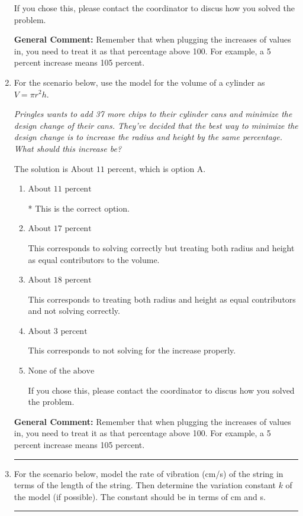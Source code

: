\documentclass{extbook}[14pt]
\newcommand{\litem}[1]{\item #1

\rule{\textwidth}{0.4pt}}
\begin{document}
\begin{enumerate}
{\begin{enumerate}[label=\Alph*.]
If you chose this, please contact the coordinator to discus how you solved the problem.
\end{enumerate}

\textbf{General Comment:} Remember that when plugging the increases of values in, you need to treat it as that percentage above 100. For example, a 5 percent increase means 105 percent.
}
\litem{
For the scenario below, use the model for the volume of a cylinder as $V = \pi r^2 h$.

\begin{center}
    \textit{ Pringles wants to add 37 \text{percent} more chips to their cylinder cans and minimize the design change of their cans. They've decided that the best way to minimize the design change is to increase the radius and height by the same percentage. What should this increase be? }
\end{center}


The solution is \( \text{About } 11 \text{ percent} \), which is option A.\begin{enumerate}[label=\Alph*.]
\item \( \text{About } 11 \text{ percent} \)

* This is the correct option.
\item \( \text{About } 17 \text{ percent} \)

This corresponds to solving correctly but treating both radius and height as equal contributors to the volume.
\item \( \text{About } 18 \text{ percent} \)

This corresponds to treating both radius and height as equal contributors and not solving correctly.
\item \( \text{About } 3 \text{ percent} \)

This corresponds to not solving for the increase properly.
\item \( \text{None of the above} \)

If you chose this, please contact the coordinator to discus how you solved the problem.
\end{enumerate}

\textbf{General Comment:} Remember that when plugging the increases of values in, you need to treat it as that percentage above 100. For example, a 5 percent increase means 105 percent.
}
\litem{
For the scenario below, model the rate of vibration (cm/s) of the string in terms of the length of the string. Then determine the variation constant $k$ of the model (if possible). The constant should be in terms of cm and s.

}
\end{enumerate}
\end{document}
